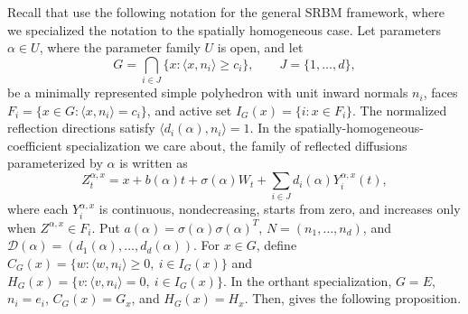 \documentclass[aihp]{imsart}
\numberwithin{equation}{section}
\theoremstyle{plain}
\theoremstyle{definition}
\newcommand{\1}{\mathbf 1}
\begin{document}
Recall that \cite{LipshutzRamanan2019,LipshutzRamanan2021} use the following notation for the general SRBM framework, where we specialized the notation to the spatially homogeneous case.  Let parameters $\alpha\in U$, where the parameter family
$U$ is open, and let
\[
        G=\bigcap_{i\in J}\{x:\langle x,n_i\rangle\ge c_i\},
        \qquad J=\{1,\ldots,d\},
\]
be a minimally represented simple polyhedron with unit inward normals $n_i$,
faces $F_i=\{x\in G:\langle x,n_i\rangle=c_i\}$, and active set
$I_G(x)=\{i:x\in F_i\}$.  The normalized reflection directions satisfy
$\langle d_i(\alpha),n_i\rangle=1$.  In the spatially-homogeneous-coefficient specialization we care about, the family of reflected diffusions parameterized by $\alpha$ is written as
\[
        Z_t^{\alpha,x}
        =
        x+b(\alpha)t+\sigma(\alpha)W_t
        +\sum_{i\in J}d_i(\alpha)Y_i^{\alpha,x}(t),
\]
where each $Y_i^{\alpha,x}$ is continuous, nondecreasing, starts from zero, and
increases only when $Z^{\alpha,x}\in F_i$.  Put
$a(\alpha)=\sigma(\alpha)\sigma(\alpha)^T$,
$N=(n_1,\ldots,n_d)$, and
$\mathcal D(\alpha)=(d_1(\alpha),\ldots,d_d(\alpha))$.  For $x\in G$, define
$C_G(x)=\{w:\langle w,n_i\rangle\ge0,\ i\in I_G(x)\}$ and
$H_G(x)=\{v:\langle v,n_i\rangle=0,\ i\in I_G(x)\}$.  In the orthant
specialization, $G=E$, $n_i=e_i$, $C_G(x)=G_x$, and $H_G(x)=H_x$. Then, \cite{LipshutzRamanan2019, LipshutzRamanan2021} gives the following proposition.
\end{document}
